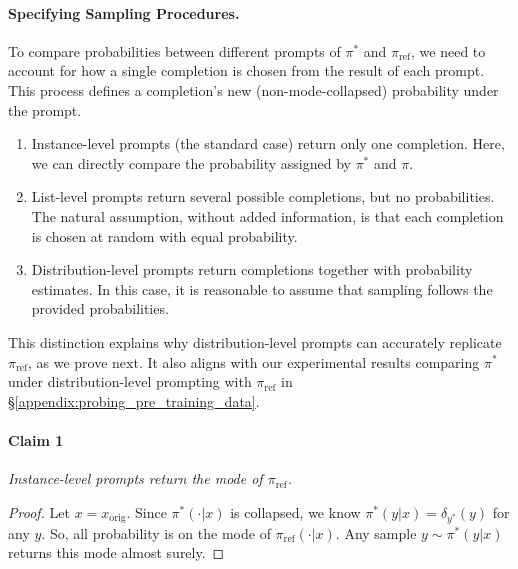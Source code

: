 \paragraph{Specifying Sampling Procedures.} To compare probabilities between different prompts of $\pi^*$ and $\pi_{\text{ref}}$, we need to account for how a single completion is chosen from the result of each prompt. This process defines a completion's new (non-mode-collapsed) probability under the prompt.
\begin{enumerate}
    \item Instance-level prompts (the standard case) return only one completion. Here, we can directly compare the probability assigned by $\pi^*$ and $\pi$.
    \item List-level prompts return several possible completions, but no probabilities. The natural assumption, without added information, is that each completion is chosen at random with equal probability.
    \item Distribution-level prompts return completions together with probability estimates. In this case, it is reasonable to assume that sampling follows the provided probabilities.
\end{enumerate}
This distinction explains why distribution-level prompts can accurately replicate $\pi_{\text{ref}}$, as we prove next. It also aligns with our experimental results comparing $\pi^*$ under distribution-level prompting with $\pi_{\text{ref}}$ in \S\ref{appendix:probing_pre_training_data}.

\paragraph{Claim 1} \textit{Instance-level prompts return the mode of $\pi_\text{ref}$.} 
\begin{proof}
Let $x = x_\text{orig}$. Since $\pi^*(\cdot | x)$ is collapsed, we know $\pi^*(y | x) = \delta_{y^*}(y)$ for any $y$. So, all probability is on the mode of $\pi_\textrm{ref}(\cdot |x)$. Any sample $y \sim \pi^*(y | x)$ returns this mode almost surely.
\end{proof}

